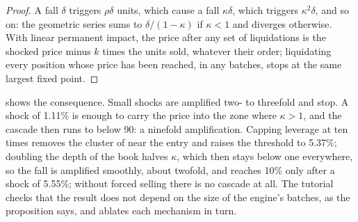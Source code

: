 \begin{proof}
A fall $\delta$ triggers $\rho\delta$ units, which cause a fall $\kappa\delta$, which triggers $\kappa^2\delta$, and so
on: the geometric series sums to $\delta/(1 - \kappa)$ if $\kappa < 1$ and diverges otherwise. With linear permanent
impact, the price after any set of liquidations is the shocked price minus $k$ times the units sold, whatever their
order; liquidating every position whose price has been reached, in any batches, stops at the same largest fixed point.
\end{proof}

\begin{omfigure}

\label{fig:m3:margin-liquidation-and-loss-allocation:kappa}
\end{omfigure}

 shows the consequence. Small shocks are amplified
two- to threefold and stop. A shock of 1.11\% is enough to carry the price into the zone where $\kappa > 1$, and the
cascade then runs to below 90: a ninefold amplification. Capping leverage at ten times removes the cluster of  near the entry and raises the threshold to 5.37\%; doubling the depth of the book halves $\kappa$, which then stays below one
everywhere, so the fall is amplified smoothly, about twofold, and reaches 10\% only after a shock of 5.55\%; without
forced selling there is no cascade at all. The tutorial checks that the result does not depend on the size of the
engine's batches, as the proposition says, and ablates each mechanism in turn.

